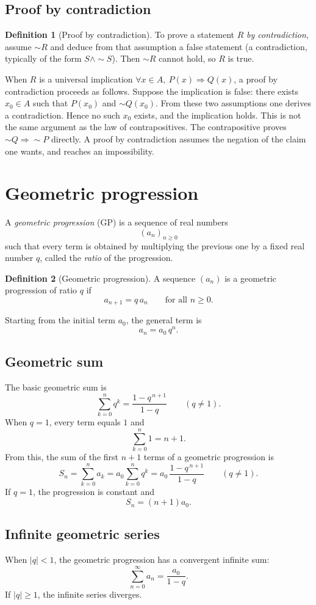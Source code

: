 \documentclass[11pt,a4paper]{article}
\theoremstyle{definition} \newtheorem{definition}{Definition} \theoremstyle{plain} \newtheorem{theorem}{Theorem}
\begin{document}
\subsection{Proof by contradiction}
\begin{definition}[Proof by contradiction] To prove a statement $R$ \emph{by contradiction}, assume $\sim R$ and deduce from that assumption a false statement (a contradiction, typically of the form $S\land\sim S$). Then $\sim R$ cannot hold, so $R$ is true. \end{definition}
When $R$ is a universal implication $\forall x\in A,\ P(x)\Rightarrow Q(x)$, a proof by contradiction proceeds as follows. Suppose the implication is false: there exists $x_0\in A$ such that $P(x_0)$ and $\sim Q(x_0)$. From these two assumptions one derives a contradiction. Hence no such $x_0$ exists, and the implication holds.
This is not the same argument as the law of contrapositives. The contrapositive proves $\sim Q\Rightarrow\sim P$ directly. A proof by contradiction assumes the negation of the claim one wants, and reaches an impossibility.
\clearpage
\section{Geometric progression}\label{sec:gprogress}
A \emph{geometric progression} (GP) is a sequence of real numbers
\[ (a_n)_{n\ge 0} \]
such that every term is obtained by multiplying the previous one by a fixed real number \(q\), called the \emph{ratio} of the progression.
\begin{definition}[Geometric progression] A sequence \((a_n)\) is a geometric progression of ratio \(q\) if
\[\boxed{ a_{n+1} = q\,a_n \qquad \text{for all } n\ge 0. }\]
\end{definition}
Starting from the initial term \(a_0\), the general term is
\[\boxed{ a_n = a_0\, q^n. }\]
\subsection{Geometric sum}
The basic geometric sum is
\[\boxed{ \sum_{k=0}^{n} q^k = \frac{1 - q^{\,n+1}}{1 - q} \qquad (q\neq 1). }\]
When \(q=1\), every term equals \(1\) and
\[ \sum_{k=0}^{n} 1 = n+1. \]
From this, the sum of the first \(n+1\) terms of a geometric progression is
\[ S_n = \sum_{k=0}^{n} a_k
= a_0 \sum_{k=0}^{n} q^k
= a_0\,\frac{1 - q^{\,n+1}}{1 - q}
\qquad (q\neq 1). \]
If \(q=1\), the progression is constant and
\[ S_n = (n+1)a_0. \]
\subsection{Infinite geometric series}
When \(|q|<1\), the geometric progression has a convergent infinite sum:
\[\boxed{ \sum_{n=0}^{\infty} a_n = \frac{a_0}{1-q}. }\]
If \(|q|\ge 1\), the infinite series diverges.
\end{document}
